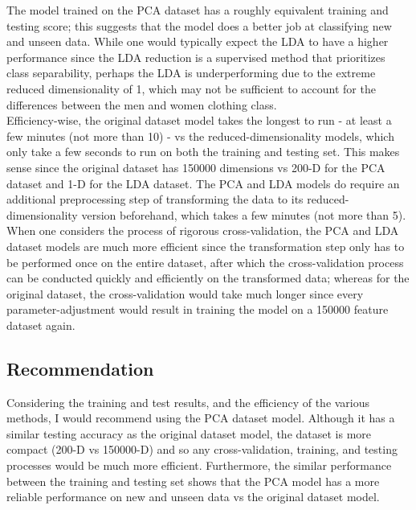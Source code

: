 \documentclass[11pt]{article}
\begin{document}
The model trained on the PCA dataset has a roughly equivalent training
and testing score; this suggests that the model does a better job at
classifying new and unseen data. While one would typically expect the
LDA to have a higher performance since the LDA reduction is a supervised
method that prioritizes class separability, perhaps the LDA is
underperforming due to the extreme reduced dimensionality of 1, which
may not be sufficient to account for the differences between the men and
women clothing class.\\

Efficiency-wise, the original dataset model takes the longest to run -
at least a few minutes (not more than 10) - vs the
reduced-dimensionality models, which only take a few seconds to run on
both the training and testing set. This makes sense since the original
dataset has 150000 dimensions vs 200-D for the PCA dataset and 1-D for
the LDA dataset. The PCA and LDA models do require an additional
preprocessing step of transforming the data to its
reduced-dimensionality version beforehand, which takes a few minutes
(not more than 5).\\

When one considers the process of rigorous cross-validation, the PCA and
LDA dataset models are much more efficient since the transformation step
only has to be performed once on the entire dataset, after which the
cross-validation process can be conducted quickly and efficiently on the
transformed data; whereas for the original dataset, the cross-validation
would take much longer since every parameter-adjustment would result in
training the model on a 150000 feature dataset again.

\subsection{Recommendation}

Considering the training and test results, and the efficiency of the
various methods, I would recommend using the PCA dataset model. Although
it has a similar testing accuracy as the original dataset model, the
dataset is more compact (200-D vs 150000-D) and so any cross-validation,
training, and testing processes would be much more efficient.
Furthermore, the similar performance between the training and testing
set shows that the PCA model has a more reliable performance on new and
unseen data vs the original dataset model.


    
    
    
    
\end{document}
